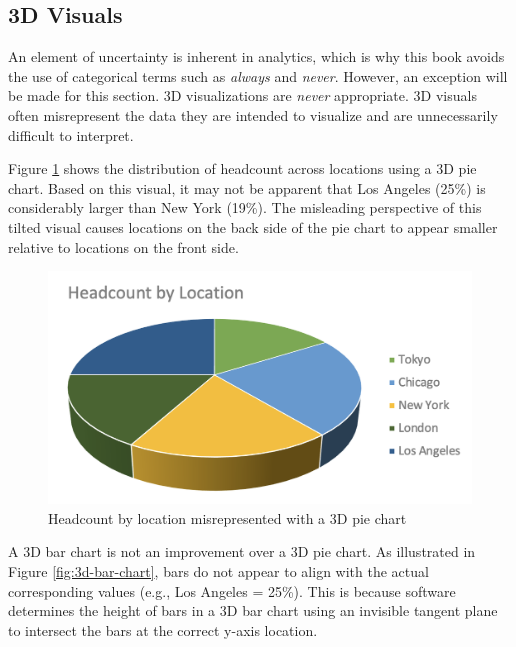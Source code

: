 \documentclass[
]{book}
\begin{document}
\hypertarget{d-visuals}{%
\subsection{3D Visuals}\label{d-visuals}}

An element of uncertainty is inherent in analytics, which is why this book avoids the use of categorical terms such as \emph{always} and \emph{never}. However, an exception will be made for this section. 3D visualizations are \emph{never} appropriate. 3D visuals often misrepresent the data they are intended to visualize and are unnecessarily difficult to interpret.

Figure \ref{fig:3d-pie-chart} shows the distribution of headcount across locations using a 3D pie chart. Based on this visual, it may not be apparent that Los Angeles (25\%) is considerably larger than New York (19\%). The misleading perspective of this tilted visual causes locations on the back side of the pie chart to appear smaller relative to locations on the front side.

\begin{figure}

{\centering \includegraphics[width=0.75\linewidth]{graphics/3d_pie_chart} 

}

\caption{Headcount by location misrepresented with a 3D pie chart}\label{fig:3d-pie-chart}
\end{figure}

A 3D bar chart is not an improvement over a 3D pie chart. As illustrated in Figure \ref{fig:3d-bar-chart}, bars do not appear to align with the actual corresponding values (e.g., Los Angeles = 25\%). This is because software determines the height of bars in a 3D bar chart using an invisible tangent plane to intersect the bars at the correct y-axis location.
\end{document}
